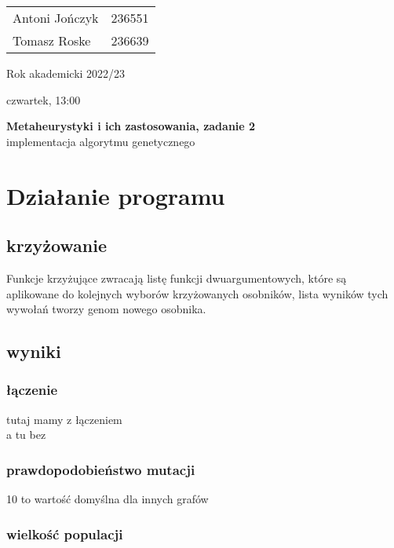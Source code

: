 \documentclass{article}
\begin{document}
\begin{minipage}{0.35\linewidth}
	\begin{tabular}{lr}
		Antoni Jończyk & 236551 \\
		Tomasz Roske   & 236639
	\end{tabular} \hfill
\end{minipage}
\hfill
\begin{minipage}{0.35\linewidth}
	\hfill Rok akademicki 2022/23 \par
	\hfill czwartek, 13:00
\end{minipage}
\bigskip \bigskip \bigskip \bigskip \bigskip
\begin{center}
	\textbf{Metaheurystyki i ich zastosowania, zadanie 2}\\
	\bigskip
	\large implementacja algorytmu genetycznego
\end{center}
\bigskip \bigskip
\section{Działanie programu}
\subsection{krzyżowanie}
Funkcje krzyżujące zwracają listę funkcji dwuargumentowych, które są aplikowane
do kolejnych wyborów krzyżowanych osobników, lista wyników tych wywołań tworzy
genom nowego osobnika.
\newpage



\subsection{wyniki}
\subsubsection{łączenie}
tutaj mamy z łączeniem \\

a tu bez \\

\subsubsection{prawdopodobieństwo mutacji}

10 to wartość domyślna dla innych grafów





\subsubsection{wielkość populacji}






\end{document}
